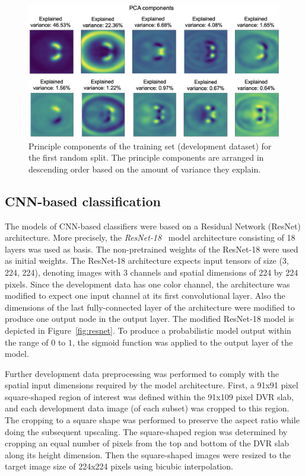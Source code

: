 \begin{figure}[ht]
  \centering
  \includegraphics[width=1.0\textwidth]{content/figures/pca_components_splittrain_enhanced.png}
  \caption{Principle components of the training set (development dataset) for the first random split.
  The principle components are arranged in descending order based on the amount of variance they explain.} 
  \label{fig:pca_components}
\end{figure} 

\subsection{CNN-based classification}
\label{subsec:cnn_based_classification}

The models of CNN-based classifiers were based on a Residual Network (ResNet) architecture.
More precisely, the \textit{ResNet-18}~\citep{resnet2015} model architecture consisting of 18 layers was used as basis.
The non-pretrained weights of the ResNet-18 were used as initial weights.
The ResNet-18 architecture expects input tensors of size (3, 224, 224), 
denoting images with 3 channels and spatial dimensions of 224 by 224 pixels.
Since the development data has one color channel, the architecture was modified to expect one input channel at its 
first convolutional layer.
Also the dimensions of the last fully-connected layer of the architecture were modified to produce one output node 
in the output layer.
The modified ResNet-18 model is depicted in Figure~\ref{fig:resnet}.
To produce a probabilistic model output within the range of $0$ to $1$, 
the sigmoid function was applied to the output layer of the model.

Further development data preprocessing was performed to comply with the spatial input 
dimensions required by the model architecture.
First, a 91x91 pixel square-shaped region of interest was defined within the 91x109 pixel DVR slab, 
and each development data image (of each subset) was cropped to this region.
The cropping to a square shape was performed to preserve the aspect ratio while doing the subsequent upscaling.
The square-shaped region was determined by cropping an equal number of pixels from the top and bottom 
of the DVR slab along its height dimension.
Then the square-shaped images were resized to the target image size of 224x224 pixels using bicubic interpolation.

